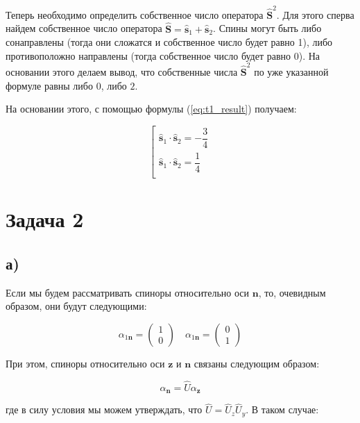 \documentclass[a4paper, 12pt]{article}
\begin{document}
Теперь необходимо определить собственное число оператора $\hat{\mathbf{S}}^2$. Для этого сперва найдем собственное число оператора $\hat{\mathbf{S}} = \hat{\mathbf{s}}_1 + \hat{\mathbf{s}}_2$. Спины могут быть либо сонаправлены (тогда они сложатся и собственное число будет равно 1), либо противоположно направлены (тогда собственное число будет равно 0). На основании этого делаем вывод, что собственные числа $\hat{\mathbf{S}}^2$ по уже указанной формуле равны либо $0$, либо $2$.

На основании этого, с помощью формулы (\ref{eq:t1_result}) получаем:

\begin{equation*}
	\boxed{
	\left[ \begin{array}{lr}
	\hat{\mathbf{s}}_1 \cdot \hat{\mathbf{s}}_2 = -\dfrac{3}{4}\\
	\hat{\mathbf{s}}_1 \cdot \hat{\mathbf{s}}_2 = \dfrac{1}{4}\\
	\end{array}
	\right.}
\end{equation*}

\section*{Задача 2}
\subsection*{а)}

Если мы будем рассматривать спиноры относительно оси $\mathbf{n}$, то, очевидным образом, они будут следующими:

\begin{equation}
	\alpha_{1\mathbf{n}} = 
	\begin{pmatrix}
		1\\
		0
	\end{pmatrix}
	\quad
	\alpha_{1\mathbf{n}} = 
	\begin{pmatrix}
		0\\
		1
	\end{pmatrix}
\end{equation} 

При этом, спиноры относительно оси $\mathbf{z}$ и $\mathbf{n}$ связаны следующим образом:

\begin{equation}
	\alpha_{\mathbf{n}} = \hat{U} \alpha_\mathbf{z}
	\label{eq:main_2}
\end{equation}

где в силу условия мы можем утверждать, что $\hat{U} = \hat{U}_z \hat{U}_y$. В таком случае:
\end{document}
